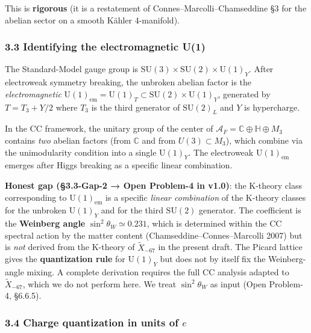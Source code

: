 \documentclass[
  11pt,
  a4paper,
]{article}
\begin{document}
This is \textbf{rigorous} (it is a restatement of Connes--Marcolli--Chamseddine §3 for the abelian sector on a smooth Kähler 4-manifold).

\hypertarget{identifying-the-electromagnetic-u1}{%
\subsubsection{3.3 Identifying the electromagnetic U(1)}\label{identifying-the-electromagnetic-u1}}

The Standard-Model gauge group is \(\mathrm{SU}(3) \times \mathrm{SU}(2) \times \mathrm{U}(1)_Y\). After electroweak symmetry breaking, the unbroken abelian factor is the \emph{electromagnetic} \(\mathrm{U}(1)_{\mathrm{em}} = \mathrm{U}(1)_T \subset \mathrm{SU}(2) \times \mathrm{U}(1)_Y\), generated by \(T = T_3 + Y/2\) where \(T_3\) is the third generator of \(\mathrm{SU}(2)_L\) and \(Y\) is hypercharge.

In the CC framework, the unitary group of the center of \(\mathcal A_F = \mathbb C \oplus \mathbb H \oplus M_3\) contains \emph{two} abelian factors (from \(\mathbb C\) and from \(U(3) \subset M_3\)), which combine via the unimodularity condition into a single \(\mathrm{U}(1)_Y\). The electroweak \(\mathrm{U}(1)_{\mathrm{em}}\) emerges after Higgs breaking as a specific linear combination.

\textbf{Honest gap (§3.3-Gap-2 → Open Problem-4 in v1.0)}: the K-theory class corresponding to \(\mathrm{U}(1)_{\mathrm{em}}\) is a specific \emph{linear combination} of the K-theory classes for the unbroken \(\mathrm{U}(1)_Y\) and for the third \(\mathrm{SU}(2)\) generator. The coefficient is the \textbf{Weinberg angle} \(\sin^2 \theta_W \simeq 0.231\), which is determined within the CC spectral action by the matter content (Chamseddine--Connes--Marcolli 2007) but is \emph{not} derived from the K-theory of \(\tilde X_{-67}\) in the present draft. The Picard lattice gives the \textbf{quantization rule} for \(\mathrm{U}(1)_Y\) but does not by itself fix the Weinberg-angle mixing. A complete derivation requires the full CC analysis adapted to \(\tilde X_{-67}\), which we do not perform here. We treat \(\sin^2\theta_W\) as input (Open Problem-4, §6.6.5).

\hypertarget{charge-quantization-in-units-of-e}{%
\subsubsection{\texorpdfstring{3.4 Charge quantization in units of \(e\)}{3.4 Charge quantization in units of e}}\label{charge-quantization-in-units-of-e}}
\end{document}
